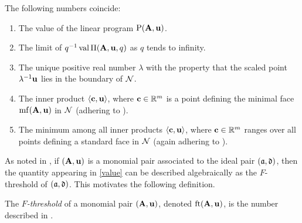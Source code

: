 \documentclass{amsart}
\begin{document}
\begin{proposition}
   \label{FT descriptions: P}
   The following numbers coincide\textup:
   \begin{enumerate}[$(1)$]
      \item\label{value} The value of the linear program $\mathrm{P}(\mathbf{A}, \mathbf{u})$.
      \item\label{limit} The limit of $q^{-1}\operatorname{val} \Pi(\mathbf{A},\mathbf{u},q)$ as $q$ tends to infinity.
      \item\label{lambda} The unique positive real number $\lambda$ with the property that the scaled point $\lambda^{-1}\mathbf{u}$ lies in the boundary of $\mathcal{N}$.
      \item\label{new ip} The inner product $\langle \mathbf{c}, \mathbf{u} \rangle$, where $\mathbf{c} \in \mathbb{R}^m$ is a point defining the minimal face $\operatorname{mf}(\mathbf{A}, \mathbf{u})$ in $\mathcal{N}$ \textup(adhering to \textup).
      \item\label{min} The minimum among all inner products $\langle \mathbf{c}, \mathbf{u} \rangle$, where $\mathbf{c} \in \mathbb{R}^m$ ranges over all points defining a standard face in $\mathcal{N}$ \textup(again adhering to \textup).
   \end{enumerate}
\end{proposition}

As noted in , if $(\mathbf{A},\mathbf{u})$ is a monomial pair associated to the ideal pair $(\mathfrak{a},\mathfrak{d})$, then the quantity appearing in \ref{value} can be described algebraically as the $F$-threshold of $(\mathfrak{a},\mathfrak{d})$.
This motivates the following definition.

\begin{definition}
\label{FT: D}
   The \emph{$F$-threshold} of a monomial pair $(\mathbf{A}, \mathbf{u})$, denoted $\operatorname{ft}(\mathbf{A}, \mathbf{u})$, is the number described in .
\end{definition}
\end{document}
